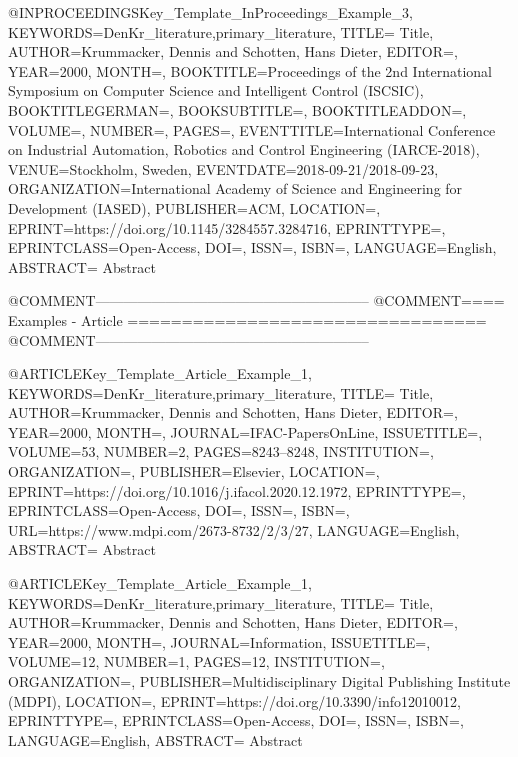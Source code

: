 @INPROCEEDINGS{Key_Template_InProceedings_Example_3,
    KEYWORDS={DenKr_literature,primary_literature},
    TITLE={\begingroup
        Title\endgroup},
    AUTHOR={Krummacker, Dennis and Schotten, Hans Dieter},
    EDITOR={},
    YEAR={2000},
    MONTH={},
    BOOKTITLE={Proceedings of the 2nd International Symposium on Computer Science and Intelligent Control (ISCSIC)},
    BOOKTITLEGERMAN={},
    BOOKSUBTITLE={},
    BOOKTITLEADDON={},
    VOLUME={},
    NUMBER={},
    PAGES={},
    EVENTTITLE={International Conference on Industrial Automation, Robotics and Control Engineering (IARCE-2018)},
    VENUE={Stockholm, Sweden},
    EVENTDATE={2018-09-21/2018-09-23},
    ORGANIZATION={International Academy of Science and Engineering for Development (IASED)},
    PUBLISHER={ACM},
    LOCATION={},
    EPRINT={https://doi.org/10.1145/3284557.3284716},
    EPRINTTYPE={},
    EPRINTCLASS={Open-Access},
    DOI={},
    ISSN={},
    ISBN={},
    LANGUAGE={English},
    ABSTRACT={\begingroup
        Abstract\endgroup}
}



@COMMENT{-----------------------------------------------------------}
@COMMENT{====  Examples - Article  =================================}
@COMMENT{-----------------------------------------------------------}

@ARTICLE{Key_Template_Article_Example_1,
    KEYWORDS={DenKr_literature,primary_literature},
    TITLE={\begingroup
        Title\endgroup},
    AUTHOR={Krummacker, Dennis and Schotten, Hans Dieter},
    EDITOR={},
    YEAR={2000},
    MONTH={},
    JOURNAL={IFAC-PapersOnLine},
    ISSUETITLE={},
    VOLUME={53},
    NUMBER={2},
    PAGES={8243--8248},
    INSTITUTION={},
    ORGANIZATION={},
    PUBLISHER={Elsevier},
    LOCATION={},
    EPRINT={https://doi.org/10.1016/j.ifacol.2020.12.1972},
    EPRINTTYPE={},
    EPRINTCLASS={Open-Access},
    DOI={},
    ISSN={},
    ISBN={},
    URL={https://www.mdpi.com/2673-8732/2/3/27},
    LANGUAGE={English},
    ABSTRACT={\begingroup
        Abstract\endgroup}
}

@ARTICLE{Key_Template_Article_Example_1,
    KEYWORDS={DenKr_literature,primary_literature},
    TITLE={\begingroup
        Title\endgroup},
    AUTHOR={Krummacker, Dennis and Schotten, Hans Dieter},
    EDITOR={},
    YEAR={2000},
    MONTH={},
    JOURNAL={Information},
    ISSUETITLE={},
    VOLUME={12},
    NUMBER={1},
    PAGES={12},
    INSTITUTION={},
    ORGANIZATION={},
    PUBLISHER={Multidisciplinary Digital Publishing Institute (MDPI)},
    LOCATION={},
    EPRINT={https://doi.org/10.3390/info12010012},
    EPRINTTYPE={},
    EPRINTCLASS={Open-Access},
    DOI={},
    ISSN={},
    ISBN={},
    LANGUAGE={English},
    ABSTRACT={\begingroup
        Abstract\endgroup}
}